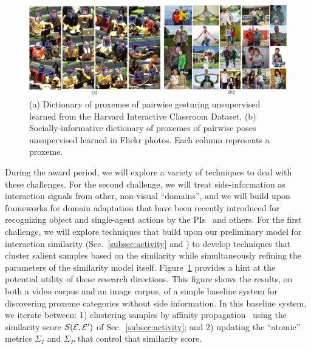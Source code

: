 \begin{figure}[t!]
\begin{center}
\includegraphics[width=\columnwidth]{socialdic}
\end{center}
\vspace{-0.25in} \caption{\captionsize (a) Dictionary of proxemes of pairwise gesturing unsupervised learned from the Harvard Interactive Classroom Dataset. (b) Socially-informative dictionary of proxemes of pairwise poses unsupervised learned in Flickr photos. Each column represents a proxeme.}
\label{fig:prodic}\afterfigspace
\end{figure}


During the award period, we will explore a variety of techniques to deal with these challenges. For the second challenge, we will treat side-information as interaction signals from other, non-visual ``domains'', and we will build upon frameworks for domain adaptation that have been recently introduced for recognizing object and single-agent actions by the PIs~\cite{LiZickler2012,Li2011} and others. For the first challenge, we will explore techniques that build upon our preliminary model for interaction similarity (Sec.~\ref{subsec:activity} and \cite{groupdet2013}) to develop techniques that cluster salient samples based on the similarity while simultaneously refining the parameters of the similarity model itself. Figure~\ref{fig:prodic} provides a hint at the potential utility of these research directions. This figure shows the results, on both a video corpus and an image corpus, of a simple baseline system for discovering proxeme categories without side information. In this baseline system, we iterate between: 1) clustering samples by affinity propagation~\cite{frey07affinitypropagation} using the similarity score $S({\cal E},{\cal E}')$ of Sec.~\ref{subsec:activity}; and 2) updating the ``atomic'' metrics $\Sigma_{I}$ and $\Sigma_{P}$ that control that similarity score.

